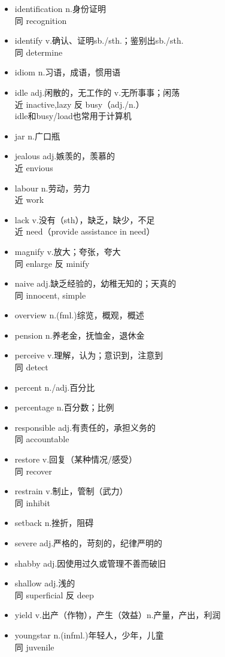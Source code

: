 \documentclass[11pt,a4paper,UTF8,titlepage]{ctexart} %
\begin{document}
\begin{multicols}{2}
\begin{itemize}[left=0em]
        \item identification n.身份证明\\同 recognition
        \item identify v.确认、证明sb./sth.；鉴别出sb./sth.\\同 determine
        \item idiom n.习语，成语，惯用语
        \item idle adj.闲散的，无工作的 v.无所事事；闲荡\\近 inactive,lazy 反 busy（adj./n.）\\idle和busy/load也常用于计算机
        \item jar n.广口瓶
        \item jealous adj.嫉羡的，羡慕的\\近 envious
        \item labour n.劳动，劳力\\近 work
        \item lack v.没有（sth），缺乏，缺少，不足\\近 need（provide assistance in need）
        \item magnify v.放大；夸张，夸大\\同 enlarge 反 minify
        \item naive adj.缺乏经验的，幼稚无知的；天真的\\同 innocent, simple
        \item overview n.(fml.)综览，概观，概述
        \item pension n.养老金，抚恤金，退休金
        \item perceive v.理解，认为；意识到，注意到\\同 detect
        \item percent n./adj.百分比
        \item percentage n.百分数；比例
        \item responsible adj.有责任的，承担义务的\\同 accountable
        \item restore v.回复（某种情况/感受）\\同 recover
        \item restrain v.制止，管制（武力）\\同 inhibit
        \item setback n.挫折，阻碍
        \item severe adj.严格的，苛刻的，纪律严明的
        \item shabby adj.因使用过久或管理不善而破旧
        \item shallow adj.浅的\\同 superficial 反 deep
        \item yield v.出产（作物），产生（效益）n.产量，产出，利润
        \item youngstar n.(infml.)年轻人，少年，儿童\\同 juvenile
    \end{itemize}
    \end{multicols}
\end{document}
